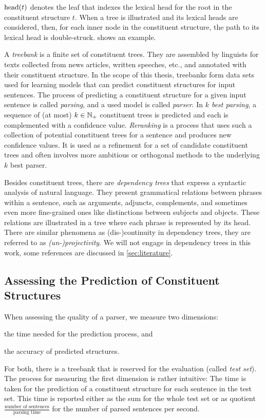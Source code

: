 \documentclass[../document.tex]{subfiles}
\begin{document}
    \(\operatorname{head}(t)\) denotes the leaf that indexes the lexical head for the root in the constituent structure \(t\).
    When a tree is illustrated and its lexical heads are considered, then, for each inner node in the constituent structure, the path to its lexical head is double-struck.
     shows an example.

    A \emph{treebank} is a finite set of constituent trees.
    They are assembled by linguists for texts collected from news articles, written speeches, etc., and annotated with their constituent structure.
    In the scope of this thesis, treebanks form data sets used for learning models that can predict constituent structures for input sentences.
    The process of predicting a constituent structure for a given input sentence is called \emph{parsing}, and a used model is called \emph{parser}.
    In \emph{\(k\) best parsing}, a sequence of (at most) \(k \in \mathbb{N}_+\) constituent trees is predicted and each is complemented with a confidence value.
    \emph{Reranking} is a process that uses such a collection of potential constituent trees for a sentence and produces new confidence values.
    It is used as a refinement for a set of candidate constituent trees and often involves more ambitious or orthogonal methods to the underlying \(k\) best parser.

    Besides constituent trees, there are \emph{dependency trees} that express a syntactic analysis of natural language.
    They present grammatical relations between phrases within a sentence, such as arguments, adjuncts, complements, and sometimes even more fine-grained ones like distinctions between subjects and objects.
    These relations are illustrated in a tree where each phrase is represented by its head.
    There are similar phenomena as (dis-)continuity in dependency trees, they are referred to as \emph{(un-)projectivity}.
    We will not engage in dependency trees in this work, some references are discussed in \cref{sec:literature}.

    \subsection{Assessing the Prediction of Constituent Structures}
    When assessing the quality of a parser, we measure two dimensions:
    \begin{inparaenum}
        \item the time needed for the prediction process, and
        \item the accuracy of predicted structures.
    \end{inparaenum}
    For both, there is a treebank that is reserved for the evaluation (called \emph{test set}).
    The process for measuring the first dimension is rather intuitive:
        The time is taken for the prediction of a constituent structure for each sentence in the test set.
    This time is reported either as the sum for the whole test set or as quotient \(\frac{\text{number of sentences}}{\text{parsing time}}\) for the number of parsed sentences per second.
\end{document}
